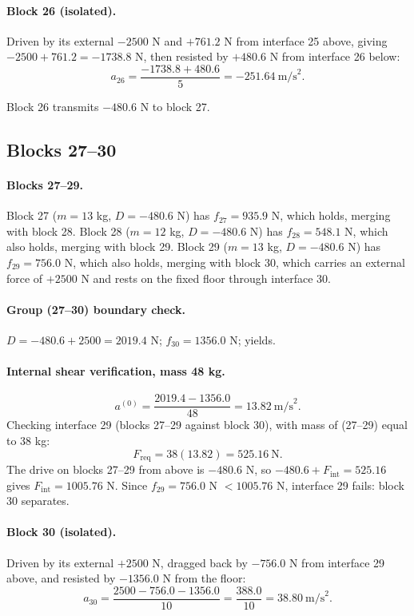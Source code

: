 \documentclass[11pt,a4paper]{article}
\begin{document}
\paragraph{Block 26 (isolated).} Driven by its external $-2500$ N and $+761.2$ N from interface 25 above, giving $-2500+761.2=-1738.8$ N, then resisted by $+480.6$ N from interface 26 below:
\[
a_{26} = \frac{-1738.8+480.6}{5} = -251.64\ \text{m/s}^2 .
\]

Block 26 transmits $-480.6$ N to block 27.

\subsection{Blocks 27--30}

\paragraph{Blocks 27--29.} Block 27 ($m=13$ kg, $D=-480.6$ N) has $f_{27}=935.9$ N, which holds, merging with block 28. Block 28 ($m=12$ kg, $D=-480.6$ N) has $f_{28}=548.1$ N, which also holds, merging with block 29. Block 29 ($m=13$ kg, $D=-480.6$ N) has $f_{29}=756.0$ N, which also holds, merging with block 30, which carries an external force of $+2500$ N and rests on the fixed floor through interface 30.

\paragraph{Group (27--30) boundary check.} $D = -480.6+2500 = 2019.4$ N; $f_{30}=1356.0$ N; yields.

\paragraph{Internal shear verification, mass 48 kg.}
\[
a^{(0)} = \frac{2019.4-1356.0}{48} = 13.82\ \text{m/s}^2 .
\]
Checking interface 29 (blocks 27--29 against block 30), with mass of (27--29) equal to 38 kg:
\[
F_{\mathrm{req}} = 38(13.82) = 525.16\ \text{N}.
\]
The drive on blocks 27--29 from above is $-480.6$ N, so $-480.6+F_{\mathrm{int}} = 525.16$ gives $F_{\mathrm{int}} = 1005.76$ N. Since $f_{29}=756.0$ N $< 1005.76$ N, interface 29 fails: block 30 separates.

\paragraph{Block 30 (isolated).} Driven by its external $+2500$ N, dragged back by $-756.0$ N from interface 29 above, and resisted by $-1356.0$ N from the floor:
\[
a_{30} = \frac{2500-756.0-1356.0}{10} = \frac{388.0}{10} = 38.80\ \text{m/s}^2 .
\]
\end{document}
